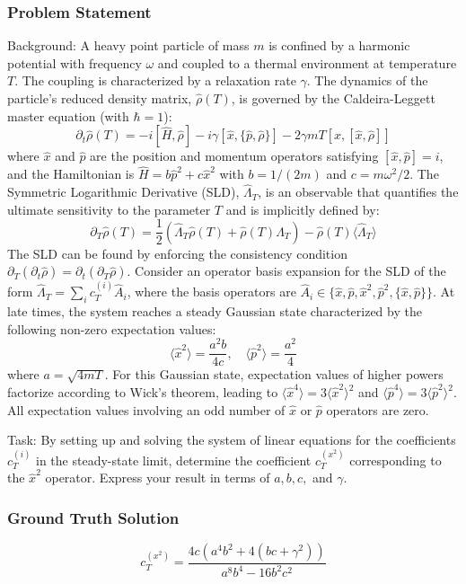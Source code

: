 \documentclass[10pt]{article}
\begin{document}
\subsubsection*{Problem Statement}
Background:
A heavy point particle of mass $m$ is confined by a harmonic potential with frequency $\omega$ and coupled to a thermal environment at temperature $T$. The coupling is characterized by a relaxation rate $\gamma$. The dynamics of the particle's reduced density matrix, $\hat{\rho}(T)$, is governed by the Caldeira-Leggett master equation (with $\hbar=1$):
$$ \partial_t \hat\rho(T) = -i [\hat H, \hat\rho] - i\gamma [\hat x,\{\hat p,\hat\rho\}]-2\gamma m T[ \hat x,[\hat x,\hat \rho]] $$
where $\hat{x}$ and $\hat{p}$ are the position and momentum operators satisfying $[\hat{x}, \hat{p}] = i$, and the Hamiltonian is $\hat H = b\hat{p}^2 + c\hat{x}^2$ with $b=1/(2m)$ and $c=m\omega^2/2$. The Symmetric Logarithmic Derivative (SLD), $\hat{\Lambda}_T$, is an observable that quantifies the ultimate sensitivity to the parameter $T$ and is implicitly defined by:
$$ \partial_T \hat \rho(T) = \frac{1}{2} \left( \hat\Lambda_T \hat\rho(T) + \hat\rho(T) \hat\Lambda_T \right) - \hat\rho(T)\langle \hat \Lambda_T \rangle $$
The SLD can be found by enforcing the consistency condition $\partial_T(\partial_t \hat{\rho}) = \partial_t(\partial_T \hat{\rho})$. Consider an operator basis expansion for the SLD of the form $\hat \Lambda_T = \sum_i c^{(i)}_T \hat A_i$, where the basis operators are $\hat A_i \in \{ \hat x, \hat p, \hat x^2, \hat p^2, \{\hat x,\hat p\} \}$. At late times, the system reaches a steady Gaussian state characterized by the following non-zero expectation values:
$$ \langle \hat{x}^2 \rangle = \frac{a^2 b}{4c}, \quad \langle \hat{p}^2 \rangle = \frac{a^2}{4} $$
where $a=\sqrt{4mT}$. For this Gaussian state, expectation values of higher powers factorize according to Wick's theorem, leading to $\langle \hat{x}^4 \rangle = 3 \langle \hat{x}^2 \rangle^2$ and $\langle \hat{p}^4 \rangle = 3 \langle \hat{p}^2 \rangle^2$. All expectation values involving an odd number of $\hat{x}$ or $\hat{p}$ operators are zero.

Task:
By setting up and solving the system of linear equations for the coefficients $c^{(i)}_T$ in the steady-state limit, determine the coefficient $c^{(x^2)}_T$ corresponding to the $\hat{x}^2$ operator. Express your result in terms of $a, b, c,$ and $\gamma$.

\subsubsection*{Ground Truth Solution}
\[ \boxed{c^{(x^2)}_T = \frac{4 c \left( a^4 b^2 + 4 (b c + \gamma^2) \right)}{a^8 b^4 - 16 b^2 c^2}} \]
\end{document}
